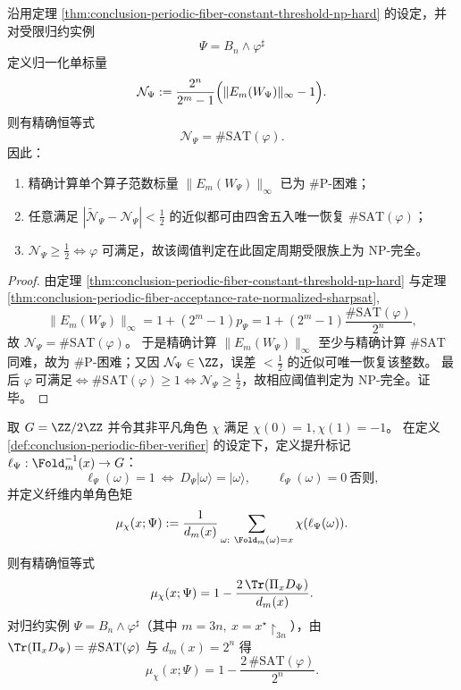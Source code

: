 \begin{theorem}\label{thm:conclusion-periodic-fiber-single-norm-exact-sharpsat}
沿用定理 \ref{thm:conclusion-periodic-fiber-constant-threshold-np-hard} 的设定，并对受限归约实例
\[
\Psi=B_n\wedge \varphi^\sharp
\]
定义归一化单标量
\[
\mathcal N_\Psi
:=
\frac{2^n}{2^m-1}\Bigl(\|E_m(W_\Psi)\|_\infty-1\Bigr).
\]
则有精确恒等式
\[
\mathcal N_\Psi=\#\mathrm{SAT}(\varphi).
\]
因此：
\begin{enumerate}
  \item 精确计算单个算子范数标量 \(\|E_m(W_\Psi)\|_\infty\) 已为 \(\#\mathrm P\)-困难；
  \item 任意满足 \(|\widetilde{\mathcal N}_\Psi-\mathcal N_\Psi|<\frac12\) 的近似都可由四舍五入唯一恢复 \(\#\mathrm{SAT}(\varphi)\)；
  \item \(\mathcal N_\Psi\ge \frac12\iff \varphi\) 可满足，故该阈值判定在此固定周期受限族上为 \(\mathrm{NP}\)-完全。
\end{enumerate}
\end{theorem}
\begin{proof}
由定理 \ref{thm:conclusion-periodic-fiber-constant-threshold-np-hard} 与定理 \ref{thm:conclusion-periodic-fiber-acceptance-rate-normalized-sharpsat},
\[
\|E_m(W_\Psi)\|_\infty=1+(2^m-1)p_\Psi
=1+(2^m-1)\frac{\#\mathrm{SAT}(\varphi)}{2^n},
\]
故 \(\mathcal N_\Psi=\#\mathrm{SAT}(\varphi)\)。
于是精确计算 \(\|E_m(W_\Psi)\|_\infty\) 至少与精确计算 \(\#\mathrm{SAT}\) 同难，故为 \(\#\mathrm P\)-困难；又因 \(\mathcal N_\Psi\in\ZZ\)，误差 \(<\frac12\) 的近似可唯一恢复该整数。
最后
\(
\varphi\ \text{可满足}\iff \#\mathrm{SAT}(\varphi)\ge1\iff \mathcal N_\Psi\ge \frac12
\)，故相应阈值判定为 \(\mathrm{NP}\)-完全。证毕。
\end{proof}

\begin{proposition}\label{prop:conclusion-periodic-fiber-single-character-moment}
取 \(G=\ZZ/2\ZZ\) 并令其非平凡角色 \(\chi\) 满足 \(\chi(0)=1,\chi(1)=-1\)。
在定义 \ref{def:conclusion-periodic-fiber-verifier} 的设定下，定义提升标记 \(\ell_\Psi:\Fold_m^{-1}(x)\to G\)：
\[
\ell_\Psi(\omega)=1\ \Longleftrightarrow\ D_\Psi|\omega\rangle=|\omega\rangle,
\qquad
\ell_\Psi(\omega)=0\ \text{否则},
\]
并定义纤维内单角色矩
\[
\mu_\chi(x;\Psi):=\frac{1}{d_m(x)}\sum_{\omega:\ \Fold_m(\omega)=x}\chi(\ell_\Psi(\omega)).
\]
则有精确恒等式
\[
\mu_\chi(x;\Psi)=1-\frac{2\,\Tr(\Pi_xD_\Psi)}{d_m(x)}.
\]
对归约实例 \(\Psi=B_n\wedge\varphi^\sharp\)（其中 \(m=3n,\ x=x^\star\!\upharpoonright_{3n}\)），由 \(\Tr(\Pi_xD_\Psi)=\#\mathrm{SAT}(\varphi)\) 与 \(d_m(x)=2^n\) 得
\[
\mu_\chi(x;\Psi)=1-\frac{2\,\#\mathrm{SAT}(\varphi)}{2^n}.
\]
\end{proposition}

